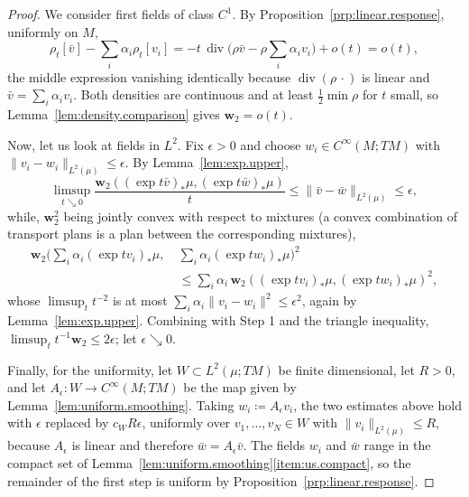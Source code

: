 \documentclass[11pt,reqno]{amsart}
\theoremstyle{plain}
\theoremstyle{definition}
\newcommand{\dw}{\mathbf{w}_2}
\DeclareMathOperator{\Div}{div}
\begin{document}
\begin{proof}
    We consider first fields of class \( C^1 \).  
    By Proposition~\ref{prp:linear.response}, uniformly on \( M \),
    \[
        \rho_t[\bar v]-\sum_i\alpha_i\rho_t[v_i]=-t\,\Div\Big(\rho\bar v-\rho\sum_i\alpha_iv_i\Big)+o(t)=o(t),
    \]
    the middle expression vanishing identically because \( \Div(\rho\,\cdot) \) is linear and \( \bar v=\sum_i\alpha_iv_i \).
    Both densities are continuous and at least \( \tfrac12\min\rho \) for \( t \) small, so Lemma~\ref{lem:density.comparison} gives \( \dw=o(t) \).

    Now, let us look at fields in \( L^2 \).
    Fix \( \epsilon>0 \) and choose \( w_i\in C^\infty(M;TM) \) with \( \lVert v_i-w_i\rVert_{L^2(\mu)}\le\epsilon \).
    By Lemma~\ref{lem:exp.upper},
    \[
        \limsup_{t\searrow0}\frac{\dw\left((\exp t\bar v)_\ast\mu,(\exp t\bar w)_\ast\mu\right)}{t}\le\lVert\bar v-\bar w\rVert_{L^2(\mu)}\le\epsilon ,
    \]
    while, \( \dw^2 \) being jointly convex with respect to mixtures (a convex combination of transport plans is a plan between the corresponding mixtures),
    \begin{align*}
        \dw\Bigg(\sum_i\alpha_i(\exp tv_i)_\ast\mu,\ & \sum_i\alpha_i(\exp tw_i)_\ast\mu\Bigg)^2\\
        &\le \sum_i\alpha_i\,\dw\left((\exp tv_i)_\ast\mu,(\exp tw_i)_\ast\mu\right)^2,
\end{align*}
    whose \( \limsup_{t}t^{-2} \) is at most \( \sum_i\alpha_i\lVert v_i-w_i\rVert^2\le\epsilon^2 \), again by Lemma~\ref{lem:exp.upper}. 
    Combining with Step 1 and the triangle inequality, \( \limsup_tt^{-1}\dw\le2\epsilon \); let \( \epsilon\searrow0 \).

    Finally, for the uniformity, let \( W\subset L^2(\mu;TM) \) be finite dimensional, let \( R>0 \), and let \( A_\epsilon:W\to C^\infty(M;TM) \) be the map given by Lemma~\ref{lem:uniform.smoothing}.
    Taking \( w_i\coloneqq A_\epsilon v_i \), the two estimates above hold with \( \epsilon \) replaced by \( c_WR\epsilon \), uniformly over \( v_1,\dots,v_N\in W \) with \( \lVert v_i\rVert_{L^2(\mu)}\le R \), because \( A_\epsilon \) is linear and therefore \( \bar w=A_\epsilon\bar v \).
    The fields \( w_i \) and \( \bar w \) range in the compact set of Lemma~\ref{lem:uniform.smoothing}\ref{item:us.compact}, so the remainder of the first step is uniform by Proposition~\ref{prp:linear.response}.
\end{proof}
\end{document}
